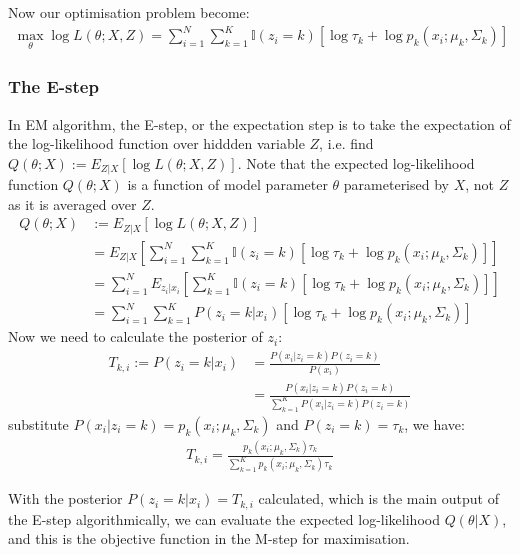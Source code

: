 \documentclass{article} [10pt] %
\begin{document}
Now our optimisation problem become:
\begin{align}
	\max_{\theta}\log L(\theta;X, Z)= \sum_{i=1}^N \sum_{k=1}^K \mathbb{I}(z_i=k)\left[\log\tau_k + \log p_k(x_i; \mu_k, \Sigma_k)\right]
\end{align}

\subsubsection{The E-step}
In EM algorithm, the E-step, or the expectation step is to take the expectation of the log-likelihood function over hiddden variable $Z$, i.e. find $Q(\theta; X):=E_{Z|X}[\log L(\theta;X, Z)]$. Note that the expected log-likelihood function $Q(\theta;X)$ is a function of model parameter $\theta$ parameterised by $X$, not $Z$ as it is averaged over $Z$.
\begin{align}
	Q(\theta;X)&:=E_{Z|X}[\log L(\theta;X, Z)]\\
	&=E_{Z|X}\left[\sum_{i=1}^N \sum_{k=1}^K\mathbb{I}(z_i=k)\left[\log\tau_k + \log p_k(x_i; \mu_k, \Sigma_k)\right]\right]\\
	&=\sum_{i=1}^N E_{z_i|x_i} \left[\sum_{k=1}^K\mathbb{I}(z_i=k)\left[\log\tau_k + \log p_k(x_i; \mu_k, \Sigma_k)\right] \right]\\
	&=\sum_{i=1}^N \sum_{k=1}^K P(z_i=k|x_i)\left[\log\tau_k + \log p_k(x_i; \mu_k, \Sigma_k)\right]
\end{align}
Now we need to calculate the posterior of $z_i$:
\begin{align}
	T_{k, i}:=P(z_i=k|x_i) &= \frac{P(x_i|z_i=k )P(z_i=k) }{P(x_i)}\\
	&=\frac{P(x_i|z_i=k )P(z_i=k) }{\sum_{k=1}^KP(x_i|z_i=k)P(z_i=k)}
\end{align}
substitute $P(x_i|z_i=k )=p_k(x_i;\mu_k,\Sigma_k)$ and $P(z_i=k)=\tau_k$, we have:
\begin{align}\label{eq:expectation_T}
\boxed{
	T_{k, i}=\frac{p_k(x_i;\mu_k,\Sigma_k)\tau_k}{\sum_{k=1}^Kp_k(x_i;\mu_k,\Sigma_k)\tau_k}
}
\end{align}

With the posterior $P(z_i=k|x_i)=T_{k, i}$ calculated, which is the main output of the E-step algorithmically, we can evaluate the expected log-likelihood $Q(\theta|X)$, and this is the objective function in the M-step for maximisation.
\end{document}

